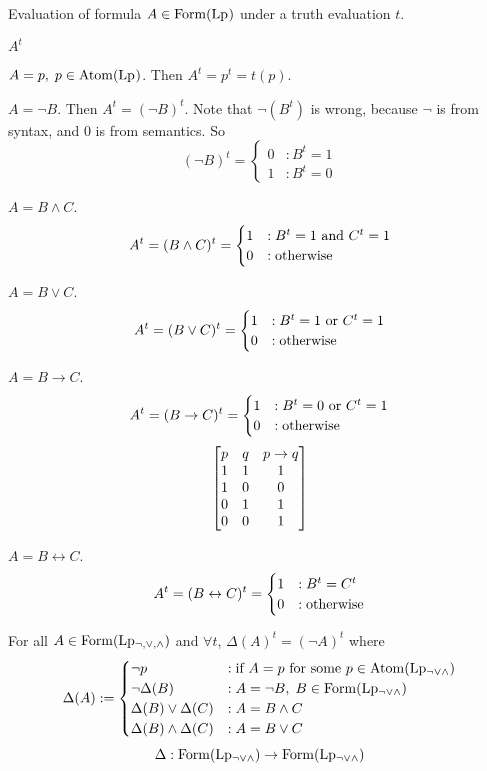 \documentclass[12pt]{article}
\begin{document}
\bbox
\begin{defn}
  Evaluation of formula \(A\in\TR{Form}\Lp\) under a truth evaluation
  \(t\).
  \bboxnote
  \begin{nota}
    \(A^t\)
  \end{nota}
  \ebox
  
   \(A=p,\;p\in\TR{Atom}\Lp\). Then \(A^t=p^t=t(p)\).
  
   \(A=\neg B\).  Then \(A^t=(\neg B)^t\).
  Note that \(\neg(B^t)\) is wrong, because \(\neg\) is from syntax, and \(0\)
  is from semantics. So
  \[(\neg B)^t=\begin{cases}0&:B^t=1\\ 1&:B^t=0\end{cases}\]

   \(A=B\wedge C\).
  \[A^t=(B\wedge C)^t=\begin{cases}1&:B^t=1\T{ and }C^t=1\\ 0&:\T{otherwise}\end{cases}\]

   \(A=B\vee C\).
  \[A^t=(B\vee C)^t=\begin{cases}1&:B^t=1\T{ or }C^t=1\\ 0&:\T{otherwise}\end{cases}\]

   \(A=B\to C\).
  \[A^t=(B\to C)^t=\begin{cases}1&:B^t=0\T{ or }C^t=1\\ 0&:\T{otherwise}\end{cases}\]
  \bboxnote
  \[\mat{
      p & q & p\to q\\
      1 & 1 & 1\\
      1 & 0 & 0\\
      0 & 1 & 1\\
      0 & 0 & 1
  }\]
  \ebox

   \(A=B\leftrightarrow C\).
  \[A^t=(B\leftrightarrow C)^t=\begin{cases}1&:B^t=C^t\\ 0&:\T{otherwise}\end{cases}\]
\end{defn}
\ebox

\bbox
\begin{thm}
  For all \(A\in\TR{Form}\Lp[\neg,\vee,\wedge]\) and \(\forall t\), \(\Delta(A)^t
  =(\neg A)^t\) where
  \[\Delta(A):=\begin{cases}
    \neg p &:\T{if }A=p\T{ for some }p\in\TR{Atom}\Lp[\neg\vee\wedge]\\
    \neg\Delta(B)&:A=\neg B,\;B\in\TR{Form}\Lp[\neg\vee\wedge]\\
    \Delta(B)\vee\Delta(C)&:A=B\wedge C\\
    \Delta(B)\wedge\Delta(C)&:A=B\vee C
  \end{cases}\]
  \[\Delta:\TR{Form}\Lp[\neg\vee\wedge]\to\TR{Form}\Lp[\neg\vee\wedge]\]
\end{thm}
\ebox
\end{document}

